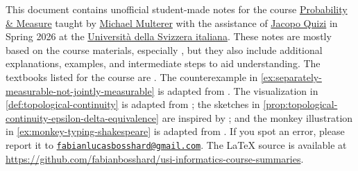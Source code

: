 \hypersetup{pageanchor=true}


\tableofcontents

\clearpage


This document contains unofficial student-made notes for the course
\href{https://search.usi.ch/en/courses/35275987/probability-measure}{Probability \& Measure}
taught by
\href{https://muchip.github.io}{Michael Multerer}
with the assistance of
\href{https://search.usi.ch/en/people/41cc6fa578d8e9a32c12472007ae5ee9/quizi-jacopo}{Jacopo Quizi}
in Spring 2026 at the
\href{https://www.usi.ch/it}{Universit{\`a} della Svizzera italiana}.
These notes are mostly based on the course materials, especially \cite{multererPM}, but they also include additional explanations, examples, and intermediate steps to aid understanding. 
The textbooks listed for the course are \cite{halmosMeasureTheory,shumMeasureTheoreticProbability}.
The counterexample in \autoref{ex:separately-measurable-not-jointly-measurable}
is adapted from \cite{mathSESeparateMeasurable}.
The visualization in \autoref{def:topological-continuity} is adapted from
\cite{texSETopologicalContinuity}; the sketches in
\autoref{prop:topological-continuity-epsilon-delta-equivalence} are inspired by
\cite{texSEEpsilonDeltaLimit,texSEEpsilonDeltaGraph}; and the monkey illustration
in \autoref{ex:monkey-typing-shakespeare} is adapted from \cite{texSEMonkeyIcon}.
If you spot an error, please report it to
\href{mailto:fabianlucasbosshard@gmail.com}{\nolinkurl{fabianlucasbosshard@gmail.com}}.
The \LaTeX{} source is available at
\url{https://github.com/fabianbosshard/usi-informatics-course-summaries}.

\doclicenseThis

\printbibliography[heading=bibintoc,title={References}]


\clearpage


